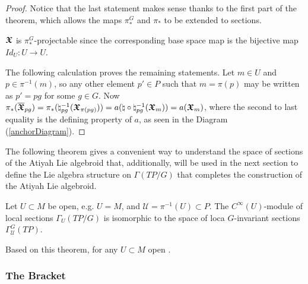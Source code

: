 \begin{proof}
Notice that the last statement makes sense thanks to the first part of the theorem, which allows the maps $\pi_*^G$ and $\pi_*$ to be extended to sections.%

$\bm{\mathfrak{X}}$ is $\pi_*^G$-projectable since the corresponding base space map is the bijective map $Id_U: U \to U$.

The following calculation proves the remaining statements. Let $m \in U$ and $p \in \pi^{-1}(m)$, so any other element $p' \in P$ such that $m = \pi(p)$ may be written as $p' = pg$ for some $g \in G$. Now %
$\pi_*(\overline{\bm{\bm{\mathfrak{X}}}}_{pg}) = \pi_*(\natural^{-1}_{pg}(\bm{\mathfrak{X}}_{\pi(pg)})) = a(\natural \circ \natural^{-1}_{pg}(\bm{\mathfrak{X}}_{m})) = a(\bm{\mathfrak{X}}_{m})$, where the second to last equality is the defining property of $a$, as seen in the Diagram (\ref{anchorDiagram}). 
\end{proof}

The following theorem gives a convenient way to understand the space of sections of the Atiyah Lie algebroid that, additionally, will be used in the next section to define the Lie algebra structure on $\Gamma(TP/G)$ that completes the construction of the Atiyah Lie algebroid.

\begin{theorem}\label{theoSectTPG}
Let $U \subset M$ be open, e.g. $U = M$, and $\mathcal U = \pi^{-1}(U) \subset P$. The $C^\infty(U)$-module of local sections $\Gamma_U(TP/G)$ is isomorphic to the space of loca $G$-invariant sections $\Gamma^G_{\mathcal U}(TP)$.
\end{theorem}

Based on this theorem, for any $U \subset M$ open .

\subsubsection{The Bracket}

